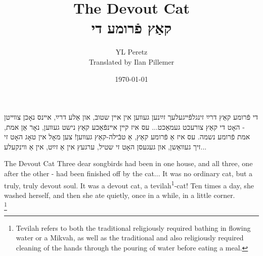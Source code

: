 \documentclass{book}
\begin{document}
\title{The Devout Cat \\ קאַץ פֿרומע די}
\author{YL Peretz\\Translated by Ilan Pillemer}
\date{\today}

\maketitle
\begin{pairs}

\begin{Rightside}
\begin{RTL}
\begin{hebrew}
\beginnumbering
\pstart
די פֿרומע קאַץ
\newline
\pend
\pstart
דרײַ זינגלפֿײגעלעך זײַנען געװען אין אײן שטוב, און אַלע דרײַ, אײנס נאָכן צװײטן - האָט די קאַץ צורעכט געמאַכט...
\pend
\pstart
עס איז קײן אײנפֿאַכע קאַץ נישט געװען, נאָר אַן אמת, אמת פֿרומע נשמה.
\pend
\pstart
עס איז אַ פֿרומע קאַץ, אַ טבֿילה-קאַץ געװען! צען מאָל אין טאָג האָט זי זיך געװאַשן, און געגעסן האָט זי שטיל, ערגעץ אין אַ זײַט, אין אַ װינקעלע...
\pend
\endnumbering
\end{hebrew}
\end{RTL}
\end{Rightside}




\begin{Leftside}
\begin{english}
\beginnumbering
\pstart
The Devout Cat
\newline
\pend
\pstart
Three dear songbirds had been in one house, and all three, one after the other - had been finished off by the cat...
\pend
\pstart
It was no ordinary cat, but a truly, truly devout soul. 
\pend
\pstart
It was a devout cat, a tevilah\textsuperscript{1}-cat!
Ten times a day, she washed herself, and then she ate quietly, once in a while, in a little corner.\\
\pend
 \footnote{Tevilah refers to both the traditional religiously required bathing in flowing water or a Mikvah, as well as the traditional and also religiously required cleaning of the hands through the pouring of water before eating a meal.} 
\endnumbering
\end{english}
\end{Leftside}

\end{pairs}
\Columns
\end{document}
